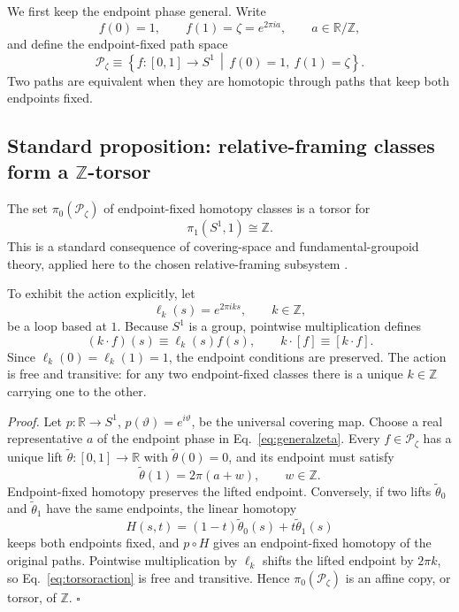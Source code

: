 \documentclass[aps,prd,reprint,superscriptaddress,nofootinbib,longbibliography,floatfix]{revtex4-2}
\begin{document}
We first keep the endpoint phase general. Write
\begin{equation}
f(0)=1,
\qquad
f(1)=\zeta=e^{2\pi i a},
\qquad a\in\mathbb R/\mathbb Z,
\label{eq:generalzeta}
\end{equation}
and define the endpoint-fixed path space
\begin{equation}
\mathcal P_{\zeta}
\equiv
\left\{
 f:[0,1]\to S^1\,\middle|\,f(0)=1,\ f(1)=\zeta
\right\}.
\label{eq:Pzeta}
\end{equation}
Two paths are equivalent when they are homotopic through paths that keep both endpoints fixed.

\subsection{Standard proposition: relative-framing classes form a $\mathbb Z$-torsor}

The set $\pi_0(\mathcal P_\zeta)$ of endpoint-fixed homotopy classes is a torsor for
\begin{equation}
\pi_1(S^1,1)\cong\mathbb Z.
\label{eq:pi1S1}
\end{equation}
This is a standard consequence of covering-space and fundamental-groupoid theory, applied here to the chosen relative-framing subsystem \cite{Brown2006,KoSmolinsky1992}.

To exhibit the action explicitly, let
\begin{equation}
\ell_k(s)=e^{2\pi i k s},
\qquad k\in\mathbb Z,
\label{eq:loopk}
\end{equation}
be a loop based at $1$. Because $S^1$ is a group, pointwise multiplication defines
\begin{equation}
(k\cdot f)(s)\equiv \ell_k(s)f(s),
\qquad
k\cdot[f]\equiv[k\cdot f].
\label{eq:torsoraction}
\end{equation}
Since $\ell_k(0)=\ell_k(1)=1$, the endpoint conditions are preserved. The action is free and transitive: for any two endpoint-fixed classes there is a unique $k\in\mathbb Z$ carrying one to the other.

\emph{Proof.} Let $p:\mathbb R\to S^1$, $p(\vartheta)=e^{i\vartheta}$, be the universal covering map. Choose a real representative $a$ of the endpoint phase in Eq.~\eqref{eq:generalzeta}. Every $f\in\mathcal P_\zeta$ has a unique lift $\widetilde\theta:[0,1]\to\mathbb R$ with $\widetilde\theta(0)=0$, and its endpoint must satisfy
\begin{equation}
\widetilde\theta(1)=2\pi(a+w),
\qquad w\in\mathbb Z.
\label{eq:liftendpointgeneral}
\end{equation}
Endpoint-fixed homotopy preserves the lifted endpoint. Conversely, if two lifts $\widetilde\theta_0$ and $\widetilde\theta_1$ have the same endpoints, the linear homotopy
\begin{equation}
H(s,t)=(1-t)\widetilde\theta_0(s)+t\widetilde\theta_1(s)
\label{eq:lifthomotopy}
\end{equation}
keeps both endpoints fixed, and $p\circ H$ gives an endpoint-fixed homotopy of the original paths. Pointwise multiplication by $\ell_k$ shifts the lifted endpoint by $2\pi k$, so Eq.~\eqref{eq:torsoraction} is free and transitive. Hence $\pi_0(\mathcal P_\zeta)$ is an affine copy, or torsor, of $\mathbb Z$. \hfill$\square$
\end{document}
